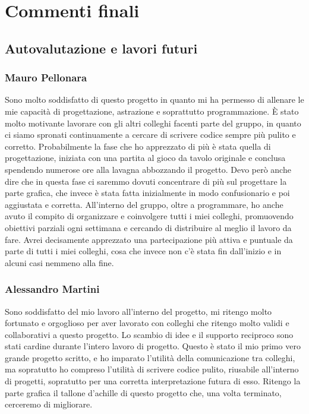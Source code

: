 \section{Commenti finali}
\subsection{Autovalutazione e lavori futuri}
\subsubsection*{Mauro Pellonara}
Sono molto soddisfatto di questo progetto in quanto mi ha permesso di allenare le mie capacità di progettazione, astrazione e soprattutto programmazione. È stato molto motivante lavorare con gli altri colleghi facenti parte del gruppo, in quanto ci siamo spronati continuamente a cercare di scrivere codice sempre più pulito e corretto. Probabilmente la fase che ho apprezzato di più è stata quella di progettazione, iniziata con una partita al gioco da tavolo originale e conclusa spendendo numerose ore alla lavagna abbozzando il progetto. Devo però anche dire che in questa fase ci saremmo dovuti concentrare di più sul progettare la parte grafica, che invece è stata fatta inizialmente in modo confusionario e poi aggiustata e corretta. All'interno del gruppo, oltre a programmare, ho anche avuto il compito di organizzare e coinvolgere tutti i miei colleghi, promuovendo obiettivi parziali ogni settimana e cercando di distribuire al meglio il lavoro da fare. Avrei decisamente apprezzato una partecipazione più attiva e puntuale da parte di tutti i miei colleghi, cosa che invece non c'è stata fin dall'inizio e in alcuni casi nemmeno alla fine.

\subsubsection*{Alessandro Martini}
Sono soddisfatto del mio lavoro all'interno del progetto, mi ritengo molto fortunato e orgoglioso per aver lavorato con colleghi che ritengo molto validi e collaborativi a questo progetto.
Lo scambio di idee e il supporto reciproco sono stati cardine durante l'intero lavoro di progetto. Questo è stato il mio primo vero grande progetto scritto, e ho imparato l'utilità della comunicazione tra colleghi, ma sopratutto ho compreso l'utilità di scrivere codice pulito, riusabile all'interno di progetti, sopratutto per una corretta interpretazione futura di esso. Ritengo la parte grafica il tallone d'achille di questo progetto che, una volta terminato, cerceremo di migliorare.
